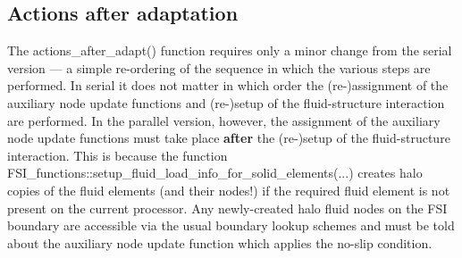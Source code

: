 \hypertarget{index_action_after_adapt}{}\subsection{Actions after adaptation}\label{index_action_after_adapt}
The {\ttfamily actions\+\_\+after\+\_\+adapt()} function requires only a minor change from the serial version --- a simple re-\/ordering of the sequence in which the various steps are performed. In serial it does not matter in which order the (re-\/)assignment of the auxiliary node update functions and (re-\/)setup of the fluid-\/structure interaction are performed. In the parallel version, however, the assignment of the auxiliary node update functions must take place {\bfseries after} the (re-\/)setup of the fluid-\/structure interaction. This is because the function {\ttfamily F\+S\+I\+\_\+functions\+::setup\+\_\+fluid\+\_\+load\+\_\+info\+\_\+for\+\_\+solid\+\_\+elements}(...) creates halo copies of the fluid elements (and their nodes!) if the required fluid element is not present on the current processor. Any newly-\/created halo fluid nodes on the F\+SI boundary are accessible via the usual boundary lookup schemes and must be told about the auxiliary node update function which applies the no-\/slip condition.


